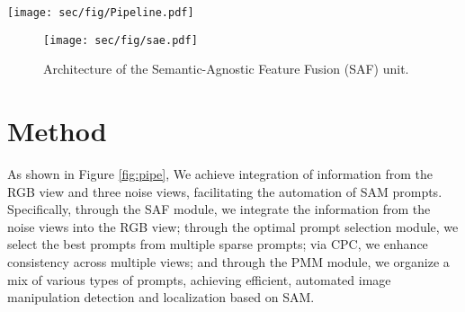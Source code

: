\begin{figure*}[ht]
	\centering
	\texttt{[image: sec/fig/Pipeline.pdf]}
	\caption{Overall framework of IMDPrompter. The prompter part consists of four views: RGB, SRM, Bayar and Noiseprint. OPS selects the optimal prediction from the four views to generate the best prompt. CPC enhances cross-view consistency. SAF introduces semantic-agnostic features. PMM achieves a mixture of multiple prompt information.}
	\label{fig:pipe}
\end{figure*}
\begin{figure}[t]
	\centering
	\texttt{[image: sec/fig/sae.pdf]}
	\caption{Architecture of the Semantic-Agnostic Feature Fusion (SAF) unit.}
	\label{fig:saf}
\end{figure}
\section{Method}
As shown in Figure \ref{fig:pipe}, We achieve integration of information from the RGB view and three noise views, facilitating the automation of SAM prompts. Specifically, through the SAF module, we integrate the information from the noise views into the RGB view; through the optimal prompt selection module, we select the best prompts from multiple sparse prompts; via CPC, we enhance consistency across multiple views; and through the PMM module, we organize a mix of various types of prompts, achieving efficient, automated image manipulation detection and localization based on SAM.


